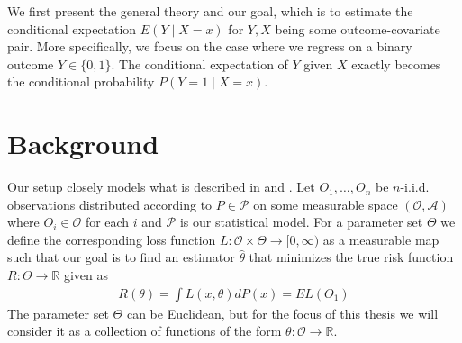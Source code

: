 \documentclass[11pt, a4paper]{article}
\theoremstyle{definition}
\theoremstyle{remark}
\begin{document}
We first present the general theory and our goal, which is to estimate the conditional expectation $ E(Y \mid X = x) $ for $ Y, X $ being some outcome-covariate pair. More specifically, we focus on the case where we regress on a binary outcome $ Y \in \{0,1\} $. The conditional expectation of $ Y $ given $ X $ exactly becomes the conditional probability $ P(Y = 1 \mid X = x) $.


\section{Background}

Our setup closely models what is described in \cite{vaart06} and \cite{laan03}. 
Let $ O_1, \ldots, O_n $ be $ n $-i.i.d. observations distributed according to $ P \in \mathcal{P} $ on some measurable space $ (\mathcal{O}, \mathcal{A}) $ where $ O_{i} \in \mathcal{O} $ for each $ i $ and $ \mathcal{P} $ is our statistical model. For a parameter set $ \Theta $ we define the corresponding loss function $ L : \mathcal{O} \times \Theta \to [0, \infty) $ as a measurable map such that our goal is to find an estimator $ \hat{\theta}  $ that minimizes the true risk function $ R: \Theta \to \mathbb{R} $ given as
\begin{align*}
    R(\theta) = \int L(x, \theta)  dP(x) = EL(O_1) 
\end{align*}
The parameter set $ \Theta $ can be Euclidean, but for the focus of this thesis we will consider it as a collection of functions of the form $ \theta : \mathcal{O} \to \mathbb{R} $. 
\end{document}
